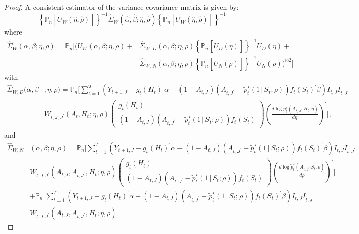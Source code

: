 \documentclass[12pt]{article}
\def\P{\mathbb{P}}
\def\given{\, | \,}
\begin{document}
\begin{proof}
A consistent estimator of the variance-covariance matrix is given by:
\begin{equation}
    \left\{ \P_n \left[\dot U_W(\hat\eta, \hat\rho) \right]\right\}^{-1} \hat\Sigma_W(\hat\alpha,\hat\beta;\hat\eta, \hat\rho) \left\{ \P_n \left[\dot U_W(\hat\eta, \hat\rho) \right]\right\}^{-1}
\end{equation}
where
\begin{align*}
    \hat\Sigma_W(\alpha,\beta;\eta, \rho) = \P_n \Big[\Big(U_W(\alpha,\beta;\eta, \rho) + &\hat\Sigma_{W,D}(\alpha,\beta;\eta, \rho) \left\{\P_n[\dot U_D(\eta)] \right\}^{-1} U_D(\eta) + \nonumber \\ &\hat\Sigma_{W,N}(\alpha,\beta;\eta, \rho)\left\{\P_n[\dot U_N(\rho)] \right\}^{-1} U_N(\rho) \Big)^ {\otimes 2} \Big]
\end{align*}
with
\begin{align*}
    \hat\Sigma_{W,D}(\alpha,\beta &; \eta, \rho)
    = \P_n \Big[ \sum_{t=1}^T \left( Y_{t+1,J} - g_t(H_t)^\prime \alpha -  (1-A_{t,J})(A_{t,J^\prime} - \tilde p_t^\star (1 \given S_t;\rho) ) f_t (S_t)^\prime \beta \right)I_{t,J}I_{t,J^\prime} \nonumber \\ &W_{t,J, J^\prime}(A_t,H_t; \eta,\rho)
    \begin{pmatrix}
  g_t(H_t) \\
  (1-A_{t,J})(A_{t,J^\prime} - \tilde {p}^\star_t (1 \given S_t;\rho) ) f_t (S_t)
\end{pmatrix}\left(\frac{d \log p^\star_t(A_{t,J^\prime}|H_t;\eta)}{d \eta} \right)^\prime \Big],
\end{align*}
and
\begin{align*}
    \hat\Sigma_{W,N}&(\alpha,\beta;\eta, \rho)
    = \P_n \Big[ \sum_{t=1}^T \left( Y_{t+1,J} - g_t(H_t)^\prime \alpha -  (1-A_{t,J})(A_{t,J^\prime} - \tilde p_t^\star (1 \given S_t;\rho) ) f_t (S_t)^\prime \beta \right)I_{t,J}I_{t,J^\prime} \nonumber \\ &W_{t,J, J^\prime}(A_{t,J},A_{t,J^\prime},H_t; \eta,\rho)
    \begin{pmatrix}
  g_t(H_t) \\
  (1-A_{t,J})(A_{t,J^\prime} - \tilde {p}^\star_t (1 \given S_t;\rho) ) f_t (S_t)
\end{pmatrix}\left(\frac{d \log \tilde p^\star_t(A_{t,J^\prime}|S_t;\rho)}{d \rho} \right)^\prime \Big] \nonumber \\
&+\P_n \Big[ \sum_{t=1}^T \left( Y_{t+1,J} - g_t(H_t)^\prime \alpha -  (1-A_{t,J})(A_{t,J^\prime} - \tilde p_t^\star (1 \given S_t;\rho) ) f_t (S_t)^\prime \beta \right)I_{t,J}I_{t,J^\prime} \nonumber \\ &W_{t,J, J^\prime}(A_{t,J},A_{t,J^\prime},H_t; \eta,\rho)

\end{align*}
\end{proof}
\end{document}
